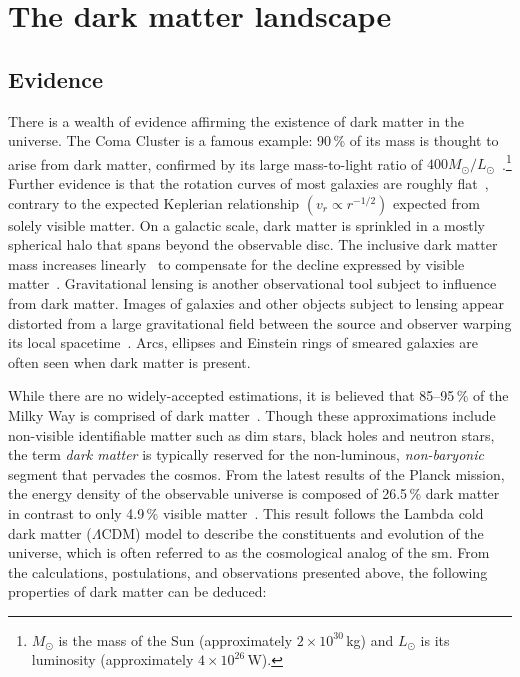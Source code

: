 

\section{The dark matter landscape}
\label{sec:theory_dm_landscape}

\subsection{Evidence}
\label{subsec:theory_dm_evidence}

There is a wealth of evidence affirming the existence of dark matter in the universe. The Coma Cluster is a famous example: 90\,\% of its mass is thought to arise from dark matter, confirmed by its large mass-to-light ratio of $\text{400} M_{\odot} / L_{\odot}$~\cite{Yozin:2015mla}.\footnote{$M_{\odot}$ is the mass of the Sun (approximately $\text{2} \times \text{10}^{30}$\,kg) and $L_{\odot}$ is its luminosity (approximately $\text{4} \times \text{10}^{26}$\,W).} Further evidence is that the rotation curves of most galaxies are roughly flat~\cite{1996MNRAS-281-27P}, contrary to the expected Keplerian relationship $(v_r \propto r^{-1/2})$ expected from solely visible matter. On a galactic scale, dark matter is sprinkled in a mostly spherical halo that spans beyond the observable disc. The inclusive dark matter mass increases linearly~\cite{2009arXiv0901.0632E} to compensate for the decline expressed by visible matter~\cite{1970ApJ-160-811F,1992AandA-256-19B}. Gravitational lensing is another observational tool subject to influence from dark matter. Images of galaxies and other objects subject to lensing appear distorted from a large gravitational field between the source and observer warping its local spacetime~\cite{2010GReGr..42.2177H}. Arcs, ellipses and Einstein rings of smeared galaxies are often seen when dark matter is present.

While there are no widely-accepted estimations, it is believed that 85--95\,\% of the Milky Way is comprised of dark matter~\cite{2005MNRAS.364..433B,2006MNRAS.370.1055B,Kafle:2014xfa}. Though these approximations include non-visible identifiable matter such as dim stars, black holes and neutron stars, the term \emph{dark matter} is typically reserved for the non-luminous, \emph{non-baryonic} segment that pervades the cosmos. From the latest results of the Planck mission, the energy density of the observable universe is composed of 26.5\,\% dark matter in contrast to only 4.9\,\% visible matter~\cite{Aghanim:2018eyx}. This result follows the Lambda cold dark matter ($\Lambda\text{CDM}$) model to describe the constituents and evolution of the universe, which is often referred to as the cosmological analog of the \acrlong{sm}. From the calculations, postulations, and observations presented above, the following properties of dark matter can be deduced:

